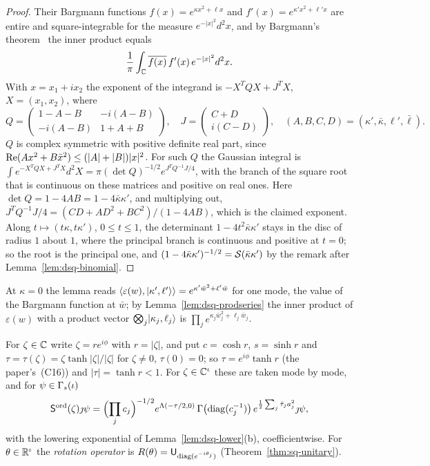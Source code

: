 \begin{veteenv}
\begin{proof}
Their Bargmann functions $f(x)=e^{\kappa x^2+\ell x}$ and $f'(x)=e^{\kappa'x^2+\ell'x}$ are entire and square-integrable
for the measure $e^{-\lvert x\rvert^2}d^2x$, and by Bargmann's theorem~\cite{bargmann} the inner product equals
\[
 \frac1\pi\int_\mathbb C\overline{f(x)}\,f'(x)\,e^{-\lvert x\rvert^2}d^2x .
\]
With $x=x_1+ix_2$ the exponent of the integrand is $-X^TQX+J^TX$, $X=(x_1,x_2)$, where
\[
 Q=\begin{pmatrix}1-A-B&-i(A-B)\\-i(A-B)&1+A+B\end{pmatrix},\quad J=\begin{pmatrix}C+D\\i(C-D)\end{pmatrix},\quad
 (A,B,C,D)=(\kappa',\bar\kappa,\ell',\bar\ell).
\]
$Q$ is complex symmetric with positive definite real part, since $\operatorname{Re}(Ax^2+B\bar x^2)\le(\lvert A\rvert+\lvert B\rvert)\lvert x\rvert^2$.
For such $Q$ the Gaussian integral is $\int e^{-X^TQX+J^TX}d^2X=\pi(\det Q)^{-1/2}e^{J^TQ^{-1}J/4}$, with the branch of the square
root that is continuous on these matrices and positive on real ones. Here $\det Q=1-4AB=1-4\bar\kappa\kappa'$, and multiplying
out, $J^TQ^{-1}J/4=(CD+AD^2+BC^2)/(1-4AB)$, which is the claimed exponent. Along $t\mapsto(t\kappa,t\kappa')$, $0\le t\le1$, the
determinant $1-4t^2\bar\kappa\kappa'$ stays in the disc of radius $1$ about $1$, where the principal branch is continuous and
positive at $t=0$; so the root is the principal one, and $(1-4\bar\kappa\kappa')^{-1/2}=\mathcal S(\bar\kappa\kappa')$ by the remark after
Lemma~\ref{lem:dsq-binomial}.
\end{proof}

At $\kappa=0$ the lemma reads $\langle\varepsilon(w),\lvert \kappa',\ell'\rangle\rangle=e^{\kappa'\bar w^2+\ell'\bar w}$ for one mode, the value of the
Bargmann function at $\bar w$; by Lemma~\ref{lem:dsq-prodseries} the inner product of $\varepsilon(w)$ with a product vector
$\bigotimes_j\lvert \kappa_j,\ell_j\rangle$ is $\prod_je^{\kappa_j\bar w_j^2+\ell_j\bar w_j}$.

\begin{definition}\label{def:dsq-squeeze}
For $\zeta\in\mathbb C$ write $\zeta=re^{i\phi}$ with $r=\lvert\zeta\rvert$, and put $c=\cosh r$, $s=\sinh r$ and
$\tau=\tau(\zeta)=\zeta\tanh\lvert\zeta\rvert/\lvert\zeta\rvert$ for $\zeta\ne0$, $\tau(0)=0$; so $\tau=e^{i\phi}\tanh r$
(the paper's~(C16)) and $\lvert\tau\rvert=\tanh r<1$. For $\zeta\in\mathbb C^\iota$ these are taken mode by mode, and for $\psi\in\Gamma_s(\iota)$
\[
 \mathsf S^{\mathrm{ord}}(\zeta)\jmath\psi=\Bigl(\prod_jc_j\Bigr)^{-1/2}e^{\Lambda(-\tau/2,0)}\,\Gamma\bigl(\operatorname{diag}(c_j^{-1})\bigr)\,
 e^{\frac12\sum_j\bar\tau_ja_j^2}\jmath\psi,
\]
with the lowering exponential of Lemma~\ref{lem:dsq-lower}(b), coefficientwise. For $\theta\in\mathbb R^\iota$ the \emph{rotation operator}
is $R(\theta)=\mathsf U_{\operatorname{diag}(e^{-i\theta_j})}$ (Theorem~\ref{thm:sq-unitary}).
\end{definition}


\end{veteenv}
